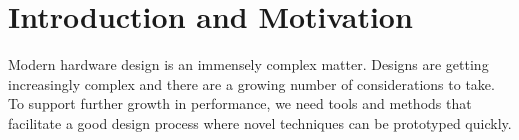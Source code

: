 \section{Introduction and Motivation}

Modern hardware design is an immensely complex matter. Designs are getting
increasingly complex and there are a growing number of considerations to take.
To support further growth in performance, we need tools and methods that
facilitate a good design process where novel techniques can be prototyped
quickly.


